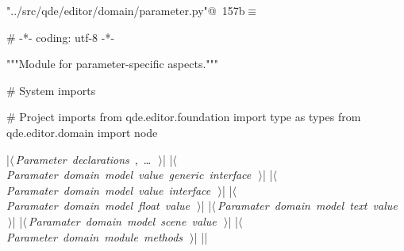 \documentclass[%
    a4paper,    %
    justified,  %
    nobib,      %
    openany     %
]{tufte-book}
\begin{document}
\begin{flushleft} \small
\begin{minipage}{\linewidth}\label{scrap179}\raggedright\small
{} \verb@"../src/qde/editor/domain/parameter.py"@\nobreak\ {\footnotesize {157b}}$\equiv$
\vspace{-1ex}
\begin{pythoncode}
# -*- coding: utf-8 -*-

"""Module for parameter-specific aspects."""

# System imports

# Project imports
from qde.editor.foundation import type as types
from qde.editor.domain import node

|\hbox{$\langle\,${\itshape Parameter declarations}\nobreak\ {\footnotesize {}, \ldots\ }$\,\rangle$}|
|\hbox{$\langle\,${\itshape Paramater domain model value generic interface}\nobreak\ {\footnotesize {}}$\,\rangle$}|
|\hbox{$\langle\,${\itshape Paramater domain model value interface}\nobreak\ {\footnotesize {}}$\,\rangle$}|
|\hbox{$\langle\,${\itshape Paramater domain model float value}\nobreak\ {\footnotesize {}}$\,\rangle$}|
|\hbox{$\langle\,${\itshape Paramater domain model text value}\nobreak\ {\footnotesize {}}$\,\rangle$}|
|\hbox{$\langle\,${\itshape Paramater domain model scene value}\nobreak\ {\footnotesize {}}$\,\rangle$}|
|\hbox{$\langle\,${\itshape Parameter domain module methods}\nobreak\ {\footnotesize {}}$\,\rangle$}|
|\NWsep|
\end{pythoncode}
\vspace{1.5ex}
\footnotesize
\begin{list}{}{\setlength{\itemsep}{-\parsep}\setlength{\itemindent}{-\leftmargin}}

\item{}
\end{list}
\end{minipage}\vspace{4ex}
\end{flushleft}
\end{document}
